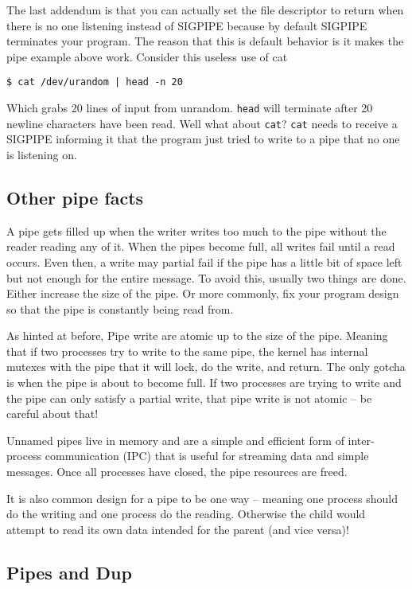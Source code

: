 The last addendum is that you can actually set the file descriptor to return when there is no one listening instead of SIGPIPE because by default SIGPIPE terminates your program.
The reason that this is default behavior is it makes the pipe example above work.
Consider this useless use of cat

\begin{verbatim}
$ cat /dev/urandom | head -n 20
\end{verbatim}
Which grabs 20 lines of input from unrandom. \texttt{head} will terminate after 20 newline characters have been read. Well what about \texttt{cat}?
\texttt{cat} needs to receive a SIGPIPE informing it that the program just tried to write to a pipe that no one is listening on.

\subsection{Other pipe facts}

A pipe gets filled up when the writer writes too much to the pipe without the reader reading any of it. When the pipes become full, all writes fail until a read occurs. Even then, a write may partial fail if the pipe has a little bit of space left but not enough for the entire message. To avoid this, usually two things are done. Either increase the size of the pipe. Or more commonly, fix your program design so that the pipe is constantly being read from.

As hinted at before, Pipe write are atomic up to the size of the pipe. Meaning that if two processes try to write to the same pipe, the kernel has internal mutexes with the pipe that it will lock, do the write, and return. The only gotcha is when the pipe is about to become full. If two processes are trying to write and the pipe can only satisfy a partial write, that pipe write is not atomic -- be careful about that!

Unnamed pipes live in memory and are a simple and efficient form of inter-process communication (IPC) that is useful for streaming data and simple messages. Once all processes have closed, the pipe resources are freed.

It is also common design for a pipe to be one way -- meaning one process should do the writing and one process do the reading. Otherwise the child would attempt to read its own data intended for the parent (and vice versa)!

\subsection{Pipes and Dup}

